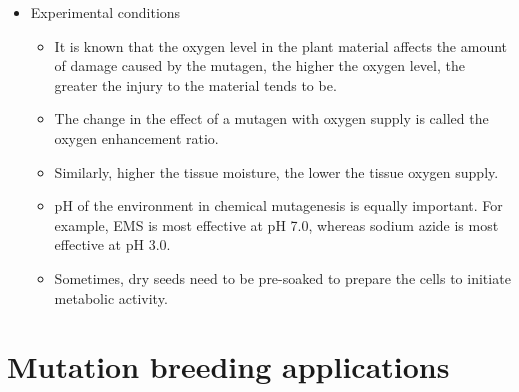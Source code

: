\documentclass[11pt,ignorenonframetext,aspectratio=169]{beamer}
\providecommand{\tightlist}{%
  \setlength{\itemsep}{0pt}\setlength{\parskip}{0pt}}
\begin{document}
\begin{frame}{}
\protect\hypertarget{section-6}{}
\begin{itemize}
\tightlist
\item
  Experimental conditions

  \begin{itemize}
  \tightlist
  \item
    It is known that the oxygen level in the plant material affects the
    amount of damage caused by the mutagen, the higher the oxygen level,
    the greater the injury to the material tends to be.
  \item
    The change in the effect of a mutagen with oxygen supply is called
    the oxygen enhancement ratio.
  \item
    Similarly, higher the tissue moisture, the lower the tissue oxygen
    supply.
  \item
    pH of the environment in chemical mutagenesis is equally important.
    For example, EMS is most effective at pH 7.0, whereas sodium azide
    is most effective at pH 3.0.
  \item
    Sometimes, dry seeds need to be pre-soaked to prepare the cells to
    initiate metabolic activity.
  \end{itemize}
\end{itemize}
\end{frame}

\hypertarget{mutation-breeding-applications}{%
\section{Mutation breeding
applications}\label{mutation-breeding-applications}}
\end{document}
